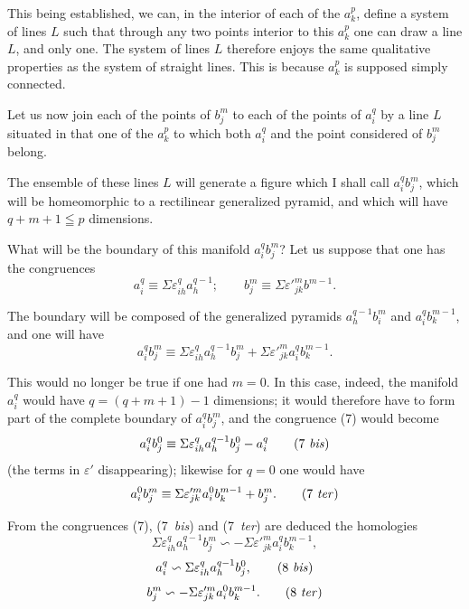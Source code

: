 \documentclass{article}
\begin{document}
This being established, we can, in the interior of each of the $a^{p}_{k}$, define a system of lines $L$ such that through any two points interior to this $a^{p}_{k}$ one can draw a line $L$, and only one. The system of lines $L$ therefore enjoys the same qualitative properties as the system of straight lines. This is because $a^{p}_{k}$ is supposed simply connected.

Let us now join each of the points of $b^{m}_{j}$ to each of the points of $a^{q}_{i}$ by a line $L$ situated in that one of the $a^{p}_{k}$ to which both $a^{q}_{i}$ and the point considered of $b^{m}_{j}$ belong.

The ensemble of these lines $L$ will generate a figure which I shall call $a^{q}_{i} b^{m}_{j}$, which will be homeomorphic to a rectilinear generalized pyramid, and which will have $q+m+1 \leqq p$ dimensions.

What will be the boundary of this manifold $a^{q}_{i} b^{m}_{j}$? Let us suppose that one has the congruences
\[ a^{q}_{i} \equiv \Sigma \varepsilon^{q}_{ih} a^{q-1}_{h}; \qquad b^{m}_{j} \equiv \Sigma \varepsilon'^{m}_{jk} b^{m-1}. \]

The boundary will be composed of the generalized pyramids $a^{q-1}_{h} b^{m}_{i}$ and $a^{q}_{i} b^{m-1}_{k}$, and one will have
\[ a^{q}_{i} b^{m}_{j} \equiv \Sigma \varepsilon^{q}_{ih} a^{q-1}_{h} b^{m}_{j} + \Sigma \varepsilon'^{m}_{jk} a^{q}_{i} b^{m-1}_{k}. \tag{7} \]

This would no longer be true if one had $m = 0$. In this case, indeed, the manifold $a^{q}_{i}$ would have $q = (q+m+1)-1$ dimensions; it would therefore have to
form part of the complete boundary of $a^{q}_{i} b^{m}_{j}$, and the congruence (7) would become
\[ a^{q}_{i} b^{0}_{j} \equiv \Sigma \varepsilon^{q}_{ih} a^{q-1}_{h} b^{0}_{j} - a^{q}_{i} \tag{7 \textit{bis}} \]
(the terms in $\varepsilon'$ disappearing); likewise for $q = 0$ one would have
\[ a^{0}_{i} b^{m}_{j} \equiv \Sigma \varepsilon'^{m}_{jk} a^{0}_{i} b^{m-1}_{k} + b^{m}_{j}. \tag{7 \textit{ter}} \]

From the congruences (7), (7~\emph{bis}) and (7~\emph{ter}) are deduced the homologies
\[ \Sigma \varepsilon^{q}_{ih} a^{q-1}_{h} b^{m}_{j} \backsim -\Sigma \varepsilon'^{m}_{jk} a^{q}_{i} b^{m-1}_{k}, \tag{8} \]
\[ a^{q}_{i} \backsim \Sigma \varepsilon^{q}_{ih} a^{q-1}_{h} b^{0}_{j}, \tag{8 \textit{bis}} \]
\[ b^{m}_{j} \backsim -\Sigma \varepsilon'^{m}_{jk} a^{0}_{i} b^{m-1}_{k}. \tag{8 \textit{ter}} \]
\end{document}
